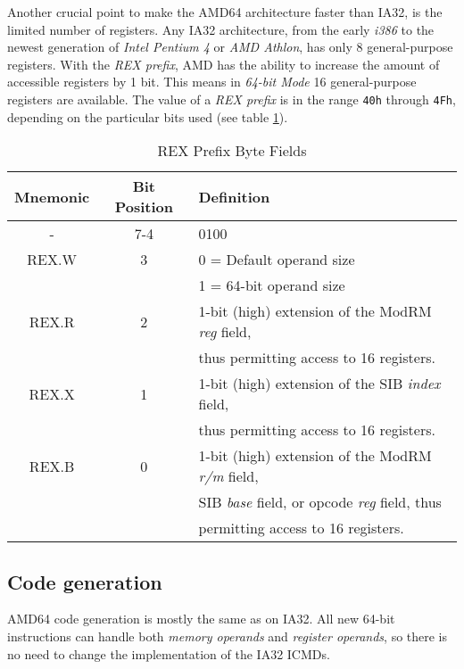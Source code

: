 Another crucial point to make the AMD64 architecture faster than IA32,
is the limited number of registers. Any IA32 architecture, from the
early \textit{i386} to the newest generation of \textit{Intel Pentium
4} or \textit{AMD Athlon}, has only 8 general-purpose registers. With
the \textit{REX prefix}, AMD has the ability to increase the amount of
accessible registers by 1 bit. This means in \textit{64-bit Mode} 16
general-purpose registers are available. The value of a \textit{REX
prefix} is in the range \texttt{40h} through \texttt{4Fh}, depending
on the particular bits used (see table \ref{REX}).

\begin{table}
\begin{center}
\begin{tabular}[b]{|c|c|l|}
\hline
Mnemonic & Bit Position & Definition \\ \hline
-        & 7-4          & 0100 \\ \hline
REX.W    & 3            & 0 = Default operand size \\
         &              & 1 = 64-bit operand size \\ \hline
REX.R    & 2            & 1-bit (high) extension of the ModRM \textit{reg} field, \\
         &              & thus permitting access to 16 registers. \\ \hline
REX.X    & 1            & 1-bit (high) extension of the SIB \textit{index} field, \\
         &              & thus permitting access to 16 registers. \\ \hline
REX.B    & 0            & 1-bit (high) extension of the ModRM \textit{r/m} field, \\
         &              & SIB \textit{base} field, or opcode \textit{reg} field, thus \\
         &              & permitting access to 16 registers. \\ \hline
\end{tabular}
\caption{REX Prefix Byte Fields}
\label{REX}
\end{center}
\end{table}


\subsection{Code generation}

AMD64 code generation is mostly the same as on IA32. All new 64-bit
instructions can handle both \textit{memory operands} and
\textit{register operands}, so there is no need to change the
implementation of the IA32 ICMDs.

